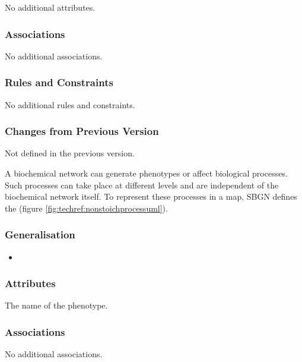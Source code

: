No additional attributes.

\subsubsection{Associations}

No additional associations.

\subsubsection{Rules and Constraints}

No additional rules and constraints.

\subsubsection{Changes from Previous Version}

Not defined in the previous version.


A biochemical network can generate phenotypes or affect biological
processes.  Such processes can take place at different levels and are
independent of the biochemical network itself.  To represent these
processes in a map, SBGN defines the  (figure \ref{fig:techref:nonstoichprocessuml}).

\subsubsection{Generalisation}

\begin{itemize}
\item {}
\end{itemize}

\subsubsection{Attributes}

\begin{attributes}
   The name of the phenotype.
\end{attributes}

\subsubsection{Associations}

No additional associations.

